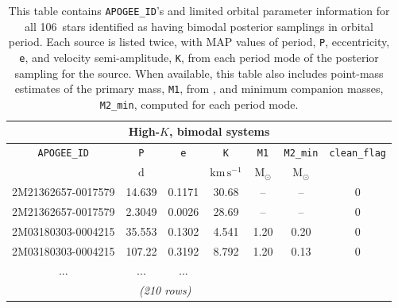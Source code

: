 \documentclass[modern, letterpaper]{aastex62}
\newcommand{\nbimodal}{106}
\begin{document}


\begin{table}[ht]
    \centering
    \begin{tabular}{c | c | c | c | c | c | c}
    \multicolumn{7}{c}{\textbf{High-$K$, bimodal systems}}\\
    \hline
    \texttt{APOGEE\_ID} & \texttt{P} & \texttt{e} & \texttt{K} &
        \texttt{M1} & \texttt{M2\_min} & \texttt{clean\_flag} \\
    & $\mathrm{d}$ & & $\mathrm{km\,s^{-1}}$ &
        $\mathrm{M_{\odot}}$ & $\mathrm{M_{\odot}}$ &  \\
    \hline
    2M21362657-0017579 & 14.639 & 0.1171 & 30.68 & -- & -- & 0 \\
    2M21362657-0017579 & 2.3049 & 0.0026 & 28.69 & -- & -- & 0 \\
    2M03180303-0004215 & 35.553 & 0.1302 & 4.541 & 1.20 & 0.20 & 0 \\
    2M03180303-0004215 & 107.22 & 0.3192 & 8.792 & 1.20 & 0.13 & 0 \\
    ... & ... & ... \\
    \hline
    \multicolumn{6}{c}{\textit{(210 rows)}}
    \end{tabular}
    \caption{This table contains \texttt{APOGEE\_ID}'s and limited orbital
    parameter information for all \nbimodal\ stars identified as having bimodal
    posterior samplings in orbital period.
    Each source is listed twice, with MAP values of period, \texttt{P},
    eccentricity, \texttt{e}, and velocity semi-amplitude, \texttt{K}, from each
    period mode of the posterior sampling for the source.
    When available, this table also includes point-mass estimates of the primary
    mass, \texttt{M1}, from \citet{Ness:2015}, and minimum companion masses,
    \texttt{M2\_min}, computed for each period mode.
    }
    \label{tbl:highK-bimodal}
\end{table}

\clearpage
\end{document}
